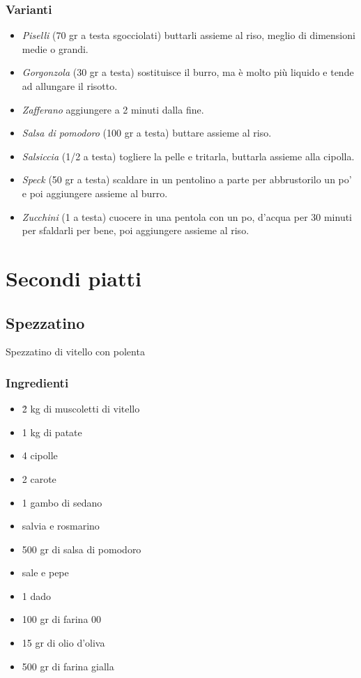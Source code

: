\documentclass[12pt, a4paper]{article}
\begin{document}
\clearpage
\subsubsection{Varianti}
\begin{itemize}
\item \emph{Piselli} (70 gr a testa sgocciolati) buttarli assieme al riso,
	meglio di dimensioni medie o grandi.
\item \emph{Gorgonzola} (30 gr a testa) sostituisce il burro, ma è molto
	più liquido e tende ad allungare il risotto.
\item \emph{Zafferano} aggiungere a 2 minuti dalla fine.
\item \emph{Salsa di pomodoro} (100 gr a testa) buttare assieme al riso.
\item \emph{Salsiccia} (1/2 a testa) togliere la pelle e tritarla, buttarla 
	assieme	alla cipolla.
\item \emph{Speck} (50 gr a testa) scaldare in un pentolino a parte per
	abbrustorilo un po' e poi aggiungere assieme al burro.
\item \emph{Zucchini} (1 a testa) cuocere in una pentola con un po, d'acqua
	per 30 minuti per sfaldarli per bene, poi aggiungere 
	assieme	al riso.
\end{itemize}
\clearpage

\section{Secondi piatti}

\subsection{Spezzatino}

Spezzatino di vitello con polenta

\subsubsection{Ingredienti}
\begin{itemize}
\item  \.2 kg di muscoletti di vitello
\item 	1 kg di patate
\item 	4 cipolle
\item 	2 carote
\item 	1 gambo di sedano
\item 	salvia e rosmarino
\item 	500 gr di salsa di pomodoro
\item 	sale e pepe
\item 	1 dado
\item 	100 gr di farina 00
\item 	15 gr di olio d'oliva
\item 	500 gr di farina gialla
\end{itemize}
\end{document}
